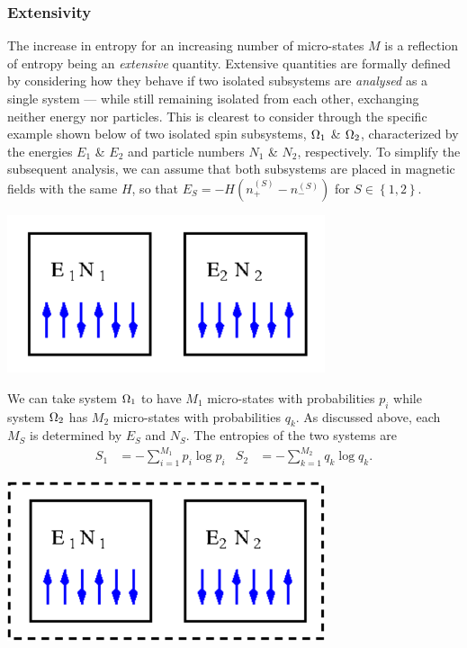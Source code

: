 \subsubsection{Extensivity}
The increase in entropy for an increasing number of micro-states $M$ is a reflection of entropy being an \textit{extensive} quantity.
Extensive quantities are formally defined by considering how they behave if two isolated subsystems are \textit{analysed} as a single system --- while still remaining isolated from each other, exchanging neither energy nor particles.
This is clearest to consider through the specific example shown below of two isolated spin subsystems, $\Omega_1$ \& $\Omega_2$, characterized by the energies $E_1$ \& $E_2$ and particle numbers $N_1$ \& $N_2$, respectively.
To simplify the subsequent analysis, we can assume that both subsystems are placed in magnetic fields with the same $H$, so that $E_S = -H\left(n_+^{(S)} - n_-^{(S)}\right)$ for $S \in \left\{1, 2\right\}$.
\begin{center}
  \includegraphics[width=0.7\textwidth]{figs/unit02_entropy-separate.pdf}
\end{center}

We can take system $\Omega_1$ to have $M_1$ micro-states with probabilities $p_i$ while system $\Omega_2$ has $M_2$ micro-states with probabilities $q_k$.
As discussed above, each $M_S$ is determined by $E_S$ and $N_S$.
The entropies of the two systems are
\begin{align*}
  S_1 & = - \sum_{i = 1}^{M_1} p_i \log p_i &
  S_2 & = - \sum_{k = 1}^{M_2} q_k \log q_k.
\end{align*}

\begin{center}
  \includegraphics[width=0.7\textwidth]{figs/unit02_entropy-combo.pdf}
\end{center}

